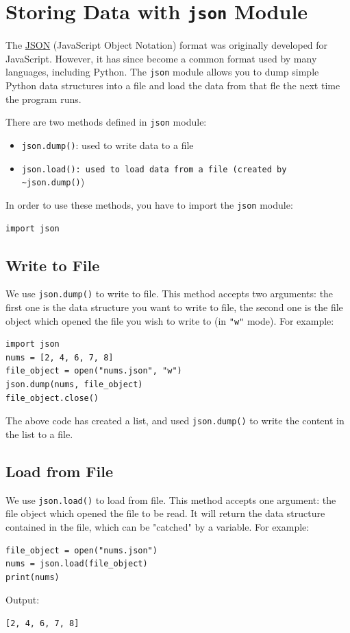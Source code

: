 \documentclass[12pt]{book}
\begin{document}
\section{Storing Data with \texttt{json} Module}
\label{sec:org2f42f7c}
The \href{http://json.org/}{JSON} (JavaScript Object Notation) format was originally developed for JavaScript. However, it has since become a common format used by many languages, including Python. The \texttt{json} module allows you to dump simple Python data structures into a file and load the data from that fle the next time the program runs.

There are two methods defined in \texttt{json} module:
\begin{itemize}
\item \texttt{json.dump()}: used to write data to a file
\item \texttt{json.load(): used to load data from a file (created by \textasciitilde{}json.dump()})
\end{itemize}
In order to use these methods, you have to import the \texttt{json} module:
\begin{verbatim}
import json
\end{verbatim}
\subsection{Write to File}
\label{sec:org3c5811f}
We use \texttt{json.dump()} to write to file. This method accepts two arguments: the first one is the data structure you want to write to file, the second one is the file object which opened the file you wish to write to (in \texttt{"w"} mode). For example:
\begin{verbatim}
import json
nums = [2, 4, 6, 7, 8]
file_object = open("nums.json", "w")
json.dump(nums, file_object)
file_object.close()
\end{verbatim}
The above code has created a list, and used \texttt{json.dump()} to write the content in the list to a file.
\subsection{Load from File}
\label{sec:orgf1226d6}
We use \texttt{json.load()} to load from file. This method accepts one argument: the file object which opened the file to be read. It will return the data structure contained in the file, which can be "catched" by a variable. For example:
\begin{verbatim}
file_object = open("nums.json")
nums = json.load(file_object)
print(nums)
\end{verbatim}
Output:
\begin{verbatim}
[2, 4, 6, 7, 8]
\end{verbatim}
\end{document}
